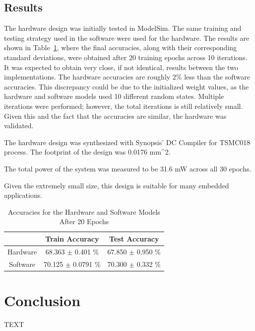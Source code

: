 \documentclass[10pt,journal]{IEEEtran}
\newcommand{\tbl}[1]{Table~\ref{#1}}
\begin{document}
	\subsection{Results}
		The hardware design was initially tested in ModelSim. The same training and testing strategy used in the software were used for the hardware. The results are shown in \tbl{table:accuracy_results}, where the final accuracies, along with their corresponding standard deviations, were obtained after 20 training epochs across 10 iterations. It was expected to obtain very close, if not identical, results between the two implementations. The hardware accuracies are roughly 2\% less than the software accuracies. This discrepancy could be due to the initialized weight values, as the hardware and software models used 10 different random states. Multiple iterations were performed; however, the total iterations is still relatively small. Given this and the fact that the accuracies are similar, the hardware was validated.
		
		The hardware design was synthesized with Synopsis' DC Compiler for TSMC018 process. The footprint of the design was 0.0176 mm^2.
		
		The total power of the system was measured to be 31.6 mW across all 30 epochs.
		
		Given the extremely small size, this design is suitable for many embedded applications.
		
		
		
		\begin{table}[!t]
			\renewcommand{\arraystretch}{1.3}
			\caption{Accuracies for the Hardware and Software Models After 20 Epochs}
			\label{table:accuracy_results}
			\centering
			\begin{tabular}{ccc}
				\hline
				         & Train Accuracy           & Test Accuracy           \\
				\hline
				Hardware & 68.363 \(\pm\) 0.401  \% & 67.850 \(\pm\) 0.950 \% \\
				Software & 70.125 \(\pm\) 0.0791 \% & 70.300 \(\pm\) 0.332 \% \\
				\hline
			\end{tabular}
		\end{table}		
	
	\section{Conclusion}
		TEXT
	
	
		
	
\end{document}
